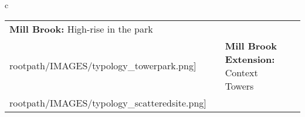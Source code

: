 \begin{table}[H]
        \begin{tabular}{c}
        \begin{tabular}{m{1.25in} m{2in} m{.1in} m{1.25in} m{2in}}
\textbf{Mill Brook:} {High-rise in the park} & \texttt{[image: \\rootpath/IMAGES/typology\_towerpark.png]} & & \textbf{Mill Brook Extension:} {Context Towers} & \texttt{[image: \\rootpath/IMAGES/typology\_scatteredsite.png]}
\end{tabular}\end{tabular}
        \end{table}